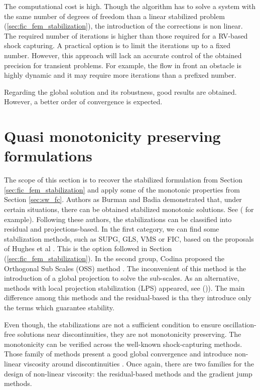 The computational cost is high. Though the algorithm has to solve a system with the same number of degrees of freedom than a linear stabilized problem (\ref{sec:fic_fem_stabilization}), the introduction of the corrections is non linear. The required number of iterations is higher than those required for a RV-based shock capturing. A practical option is to limit the iterations up to a fixed number. However, this approach will lack an accurate control of the obtained precision for transient problems. For example, the flow in front an obstacle is highly dynamic and it may require more iterations than a prefixed number.

Regarding the global solution and its robustness, good results are obtained. However, a better order of convergence is expected.






\section{Quasi monotonicity preserving formulations}
\label{sec:monotonic}



The scope of this section is to recover the stabilized formulation from Section \ref{sec:fic_fem_stabilization} and apply some of the monotonic properties from Section \ref{sec:sw_fc}. Authors as Burman and Badia demonstrated that, under certain situations, there can be obtained stabilized monotonic solutions. See (\cite{burman2007, burman2010, badia2014} for example).
Following these authors, the stabilizations can be classified into residual and projections-based. In the first category, we can find some stabilization methods, such as SUPG, GLS, VMS or FIC, based on the proposals of Hughes et al \cite{brooks1982,hughes1989,hughes1995}. This is the option followed in Section (\ref{sec:fic_fem_stabilization}). 
In the second group, Codina proposed the Orthogonal Sub Scales (OSS) method \cite{codina2000}. The inconvenient of this method is the introduction of a global projection to solve the sub-scales. As an alternative, methods with local projection stabilization (LPS) appeared, see (\cite{braak2006,badia2012,badia2014,burman2015,matthies2007})). The main difference among this methods and the residual-based is tha they introduce only the terms which guarantee stability.

Even though, the stabilizations are not a sufficient condition to ensure oscillation-free solutions near discontinuities, they are not monotonicity preserving. The monotonicity can be verified across the well-known shock-capturing methods.
Those family of methods present a good global convergence and introduce non-linear viscosity around discontinuities \cite{Johnson1990}.
Once again, there are two families for the design of non-linear viscosity: the residual-based methods and the gradient jump methods.

